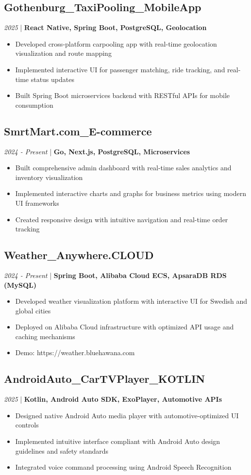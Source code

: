 \documentclass[11pt,a4paper]{article}
\begin{document}
\subsection*{Gothenburg\_TaxiPooling\_MobileApp}
\textit{2025} | \textbf{React Native, Spring Boot, PostgreSQL, Geolocation}
\begin{itemize}[noitemsep]
\item Developed cross-platform carpooling app with real-time geolocation visualization and route mapping
\item Implemented interactive UI for passenger matching, ride tracking, and real-time status updates
\item Built Spring Boot microservices backend with RESTful APIs for mobile consumption
\end{itemize}

\subsection*{SmrtMart.com\_E-commerce}
\textit{2024 - Present} | \textbf{Go, Next.js, PostgreSQL, Microservices}
\begin{itemize}[noitemsep]
\item Built comprehensive admin dashboard with real-time sales analytics and inventory visualization
\item Implemented interactive charts and graphs for business metrics using modern UI frameworks
\item Created responsive design with intuitive navigation and real-time order tracking
\end{itemize}

\subsection*{Weather\_Anywhere.CLOUD}
\textit{2024 - Present} | \textbf{Spring Boot, Alibaba Cloud ECS, ApsaraDB RDS (MySQL)}
\begin{itemize}[noitemsep]
\item Developed weather visualization platform with interactive UI for Swedish and global cities
\item Deployed on Alibaba Cloud infrastructure with optimized API usage and caching mechanisms
\item Demo: https://weather.bluehawana.com
\end{itemize}

\subsection*{AndroidAuto\_CarTVPlayer\_KOTLIN}
\textit{2025} | \textbf{Kotlin, Android Auto SDK, ExoPlayer, Automotive APIs}
\begin{itemize}[noitemsep]
\item Designed native Android Auto media player with automotive-optimized UI controls
\item Implemented intuitive interface compliant with Android Auto design guidelines and safety standards
\item Integrated voice command processing using Android Speech Recognition
\end{itemize}
\end{document}
